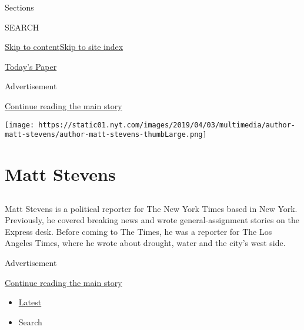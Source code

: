 Sections

SEARCH

\protect\hyperlink{site-content}{Skip to
content}\protect\hyperlink{site-index}{Skip to site index}

\href{https://myaccount.nytimes.com/auth/login?response_type=cookie\&client_id=vi}{}

\href{https://www.nytimes.com/section/todayspaper}{Today's Paper}

Advertisement

\protect\hyperlink{after-top}{Continue reading the main story}

\texttt{[image: https://static01.nyt.com/images/2019/04/03/multimedia/author-matt-stevens/author-matt-stevens-thumbLarge.png]}

\hypertarget{matt-stevens}{%
\section{Matt Stevens}\label{matt-stevens}}

\subsection{}

Matt Stevens is a political reporter for The New York Times based in New
York. Previously, he covered breaking news and wrote general-assignment
stories on the Express desk. Before coming to The Times, he was a
reporter for The Los Angeles Times, where he wrote about drought, water
and the city's west side.

Advertisement

\protect\hyperlink{after-mid1}{Continue reading the main story}

\begin{itemize}
\tightlist
\item
  \protect\hyperlink{stream-panel}{Latest}
\item
  Search
\end{itemize}

